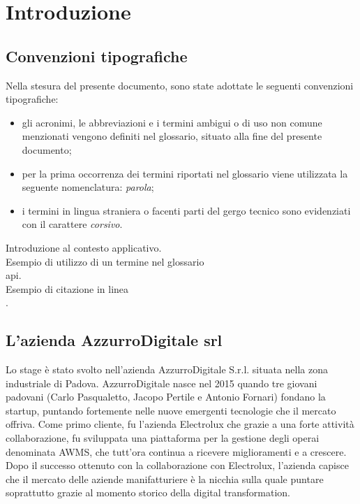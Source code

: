 
\chapter{Introduzione}
\label{cap:introduzione}

\section{Convenzioni tipografiche}
Nella stesura del presente documento, sono state adottate le seguenti convenzioni tipografiche:
\begin{itemize}
	\item gli acronimi, le abbreviazioni e i termini ambigui o di uso non comune menzionati vengono definiti nel glossario, situato alla fine del presente documento;
	\item per la prima occorrenza dei termini riportati nel glossario viene utilizzata la seguente nomenclatura: \emph{parola}\glsfirstoccur;
	\item i termini in lingua straniera o facenti parti del gergo tecnico sono evidenziati con il carattere \emph{corsivo}.
\end{itemize}
Introduzione al contesto applicativo.\\

\noindent Esempio di utilizzo di un termine nel glossario \\
\gls{api}. \\

\noindent Esempio di citazione in linea \\
\cite{site:agile-manifesto}. \\


\section{L'azienda AzzurroDigitale srl}

Lo stage è stato svolto nell'azienda AzzurroDigitale S.r.l. situata nella zona industriale di Padova. AzzurroDigitale nasce nel 2015 quando tre giovani padovani (Carlo Pasqualetto, Jacopo Pertile e Antonio Fornari) fondano la startup, puntando fortemente nelle nuove emergenti tecnologie che il mercato offriva. Come primo cliente, fu l'azienda Electrolux che grazie a una forte attività collaborazione, fu sviluppata una piattaforma per la gestione degli operai denominata AWMS, che tutt’ora continua a ricevere miglioramenti e a crescere. Dopo il successo ottenuto con la collaborazione con Electrolux, l'azienda capisce che il mercato delle aziende manifatturiere è la nicchia sulla quale puntare soprattutto grazie al momento storico della digital transformation. \\


